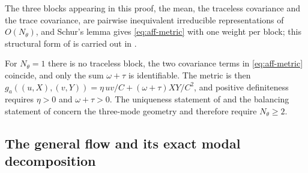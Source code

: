 The three blocks appearing in this proof, the mean, the traceless covariance and the trace covariance, are pairwise inequivalent irreducible representations of $O(N_\theta)$, and Schur's lemma gives \eqref{eq:aff-metric} with one weight per block; this structural form of  is carried out in .

\begin{remark}\label{rem:aff-dim-one}
    For $N_\theta = 1$ there is no traceless block, the two covariance terms in \eqref{eq:aff-metric} coincide, and only the sum $\omega + \tau$ is identifiable. The metric is then $g_a((u,X),(v,Y)) = \eta \, uv/C + (\omega + \tau) XY/C^2$, and positive definiteness requires $\eta > 0$ and $\omega + \tau > 0$. The uniqueness statement of  and the balancing statement of  concern the three-mode geometry and therefore require $N_\theta \geq 2$.
\end{remark}

\subsection{The general flow and its exact modal decomposition}

